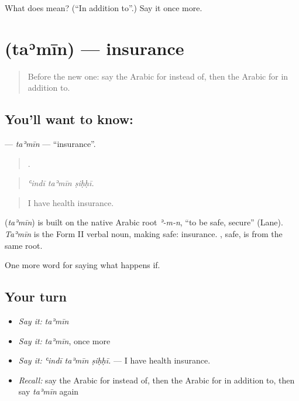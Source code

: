 \begin{tcolorbox}[breakable,colback=teal!4,colframe=teal!35!black,title={Before you move on}]
What does   mean? (\textquotedblleft{}In addition to\textquotedblright{}.) Say it once more.
\end{tcolorbox}
\section[\texorpdfstring{\ar{تأمين} (taʾmīn)}{تأمين (taʾmīn)}]{ (taʾmīn) — insurance}

\label{lesson:AR-C416-tamin}



\begin{quote}
Before the new one: say the Arabic for instead of, then the Arabic for in addition to.
\end{quote}

\subsection*{You'll want to know: }
\textbf{} — \emph{taʾmīn} — \textquotedblleft{}insurance\textquotedblright{}.

\begin{quote}
  .
\end{quote}

\begin{quote}
\emph{ʿindī taʾmīn ṣiḥḥī.}
\end{quote}

\begin{quote}
I have health insurance.
\end{quote}

\begin{cousinweb}
\textbf{} (\emph{taʾmīn}) is built on the native Arabic root \emph{ʾ-m-n}, \textquotedblleft{}to be safe, secure\textquotedblright{} (Lane). \emph{Taʾmīn} is the Form II verbal noun, making safe: insurance. , safe, is from the same root.
\end{cousinweb}

\begin{grammarlens}[title={What you've built}]
One more word for saying what happens if.
\end{grammarlens}

\subsection*{Your turn}
\begin{itemize}
\raggedright
  \item \emph{Say it:} \emph{taʾmīn}
  \item \emph{Say it:} \emph{taʾmīn}, once more
  \item \emph{Say it:} \emph{ʿindī taʾmīn ṣiḥḥī.} — I have health insurance.
  \item \emph{Recall:} say the Arabic for instead of, then the Arabic for in addition to, then say \emph{taʾmīn} again
\end{itemize}

